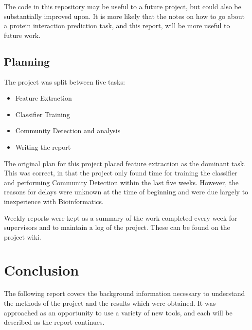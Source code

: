 The code in this repository may be useful to a future project, but could also be substantially improved upon.
It is more likely that the notes on how to go about a protein interaction prediction task, and this report, will be more useful to future work.

\subsection{Planning}

The project was split between five tasks:

\begin{itemize}
    \item Feature Extraction
    \item Classifier Training
    \item Community Detection and analysis
    \item Writing the report
\end{itemize}

The original plan for this project placed feature extraction as the dominant task.
This was correct, in that the project only found time for training the classifier and performing Community Detection within the last five weeks.
However, the reasons for delays were unknown at the time of beginning and were due largely to inexperience with Bioinformatics.

Weekly reports were kept as a summary of the work completed every week for supervisors and to maintain a log of the project.
These can be found on the project wiki\cite{opencastbiowiki}.

\section*{Conclusion}

The following report covers the background information necessary to understand the methods of the project and the results which were obtained.
It was approached as an opportunity to use a variety of new tools, and each will be described as the report continues.
